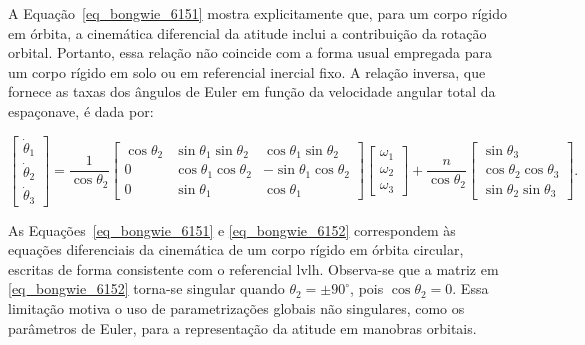 A Equação~\eqref{eq_bongwie_6151} mostra explicitamente que, para um corpo rígido em órbita, a cinemática diferencial da atitude inclui a contribuição da rotação orbital. Portanto, essa relação não coincide com a forma usual empregada para um corpo rígido em solo ou em referencial inercial fixo.
A relação inversa, que fornece as taxas dos ângulos de Euler em função da velocidade angular total da espaçonave, é dada por:

\begin{equation}
\begin{bmatrix}
\dot{\theta}_1 \\
\dot{\theta}_2 \\
\dot{\theta}_3
\end{bmatrix}
=
\frac{1}{\cos\theta_2}
\begin{bmatrix}
\cos\theta_2 & \sin\theta_1\sin\theta_2 & \cos\theta_1\sin\theta_2 \\
0 & \cos\theta_1\cos\theta_2 & -\sin\theta_1\cos\theta_2 \\
0 & \sin\theta_1 & \cos\theta_1
\end{bmatrix}
\begin{bmatrix}
\omega_1 \\
\omega_2 \\
\omega_3
\end{bmatrix}
+
\frac{n}{\cos\theta_2}
\begin{bmatrix}
\sin\theta_3 \\
\cos\theta_2\cos\theta_3 \\
\sin\theta_2\sin\theta_3
\end{bmatrix}.
\label{eq_bongwie_6152}
\end{equation}

As Equações~\eqref{eq_bongwie_6151} e \eqref{eq_bongwie_6152} correspondem às equações diferenciais da cinemática de um corpo rígido em órbita circular, escritas de forma consistente com o referencial \gls{lvlh}. Observa-se que a matriz em \eqref{eq_bongwie_6152} torna-se singular quando $\theta_2=\pm 90^\circ$, pois $\cos\theta_2=0$. Essa limitação motiva o uso de parametrizações globais não singulares, como os parâmetros de Euler, para a representação da atitude em manobras orbitais.

